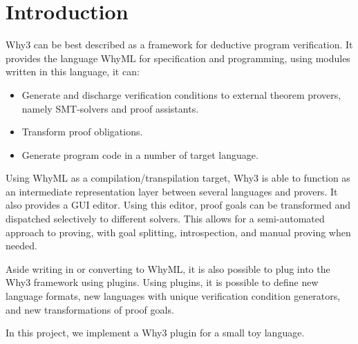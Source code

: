 \section{Introduction} %

Why3 can be best described as a framework for deductive program verification.
It provides the language WhyML for specification and programming,
using modules written in this language, it can:
\begin{itemize}
    \item Generate and discharge verification conditions to external theorem provers,
        namely SMT-solvers and proof assistants.
    \item Transform proof obligations.
    \item Generate program code in a number of target language.
\end{itemize}

Using WhyML as a compilation/transpilation target,
Why3 is able to function as an intermediate representation layer
between several languages and provers.
It also provides a GUI editor.
Using this editor, proof goals can be transformed and dispatched selectively to different solvers.
This allows for a semi-automated approach to proving,
with goal splitting, introspection, and manual proving when needed.

Aside writing in or converting to WhyML,
it is also possible to plug into the Why3 framework using plugins.
Using plugins, it is possible to define new language formats,
new languages with unique verification condition generators,
and new transformations of proof goals.

In this project, we implement a Why3 plugin for a small toy language.
